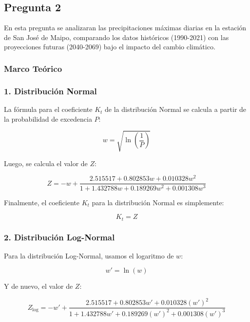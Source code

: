 \documentclass{article}  %
\begin{document}
\newpage
\subsection{Pregunta 2}

En esta pregunta se analizaran las precipitaciones máximas diarias en la estación de San José de Maipo, comparando los datos históricos (1990-2021) con las proyecciones futuras (2040-2069) bajo el impacto del cambio climático.

\subsubsection{Marco Teórico}

\subsubsection*{1. Distribución Normal}
La fórmula para el coeficiente \( K_t \) de la distribución Normal se calcula a partir de la probabilidad de excedencia \( P \):

\begin{equation}
w = \sqrt{\ln\left(\frac{1}{P}\right)}
\end{equation}

Luego, se calcula el valor de \( Z \):

\begin{equation}
Z = -w + \frac{2.515517 + 0.802853w + 0.010328w^2}{1 + 1.432788w + 0.189269w^2 + 0.001308w^3}
\end{equation}

Finalmente, el coeficiente \( K_t \) para la distribución Normal es simplemente:

\begin{equation}
K_t = Z
\end{equation}

\subsubsection*{2. Distribución Log-Normal}
Para la distribución Log-Normal, usamos el logaritmo de \( w \):

\begin{equation}
w' = \ln(w)
\end{equation}

Y de nuevo, el valor de \( Z \):

\begin{equation}
Z_{\text{log}} = -w' + \frac{2.515517 + 0.802853w' + 0.010328(w')^2}{1 + 1.432788w' + 0.189269(w')^2 + 0.001308(w')^3}
\end{equation}
\end{document}
